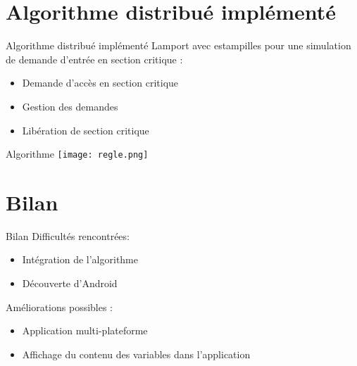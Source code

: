 \documentclass{beamer}
\begin{document}
    \section{Algorithme distribué implémenté}
    \begin{frame}{Algorithme distribué implémenté}
    Lamport avec estampilles pour une simulation de demande d’entrée en section critique :
        \begin{itemize}
            \item Demande d'accès en section critique
            \item Gestion des demandes
            \item Libération de section critique
        \end{itemize}
    \end{frame}
    \begin{frame}{Algorithme}
        \texttt{[image: regle.png]}
    \end{frame}
    \section{Bilan}
    \begin{frame}{Bilan}
        Difficultés rencontrées:
        \begin{itemize}
            \item Intégration de l'algorithme
            \item Découverte d'Android
        \end{itemize}
        Améliorations possibles :
        \begin{itemize}
            \item Application multi-plateforme
            \item Affichage du contenu des variables dans l'application
        \end{itemize}
    \end{frame}
\end{document}
